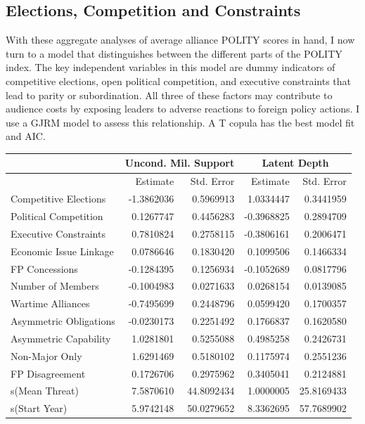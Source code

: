 \documentclass[12pt]{article}
\begin{document}
\subsection{Elections, Competition and Constraints} 


With these aggregate analyses of average alliance POLITY scores in hand, I now turn to a model that distinguishes between the different parts of the POLITY index. 
The key independent variables in this model are dummy indicators of competitive elections, open political competition, and executive constraints that lead to parity or subordination.
All three of these factors may contribute to audience costs by exposing leaders to adverse reactions to foreign policy actions. 
I use a GJRM model to assess this relationship.
A T copula has the best model fit and AIC. 


\begin{table}[ht]
\centering
\begin{tabular}{lrrrr}
 & \multicolumn{2}{c}{Uncond. Mil. Support} & \multicolumn{2}{c}{Latent Depth}\\ \hline
   & Estimate & Std. Error & Estimate & Std. Error \\ 
  \hline 
  Competitive Elections & -1.3862036 & 0.5969913 & 1.0334447 & 0.3441959 \\ 
  Political Competition & 0.1267747 & 0.4456283 & -0.3968825 & 0.2894709 \\ 
  Executive Constraints & 0.7810824 & 0.2758115 & -0.3806161 & 0.2006471 \\ 
  Economic Issue Linkage & 0.0786646 & 0.1830420 & 0.1099506 & 0.1466334 \\ 
  FP Concessions & -0.1284395 & 0.1256934 & -0.1052689 & 0.0817796 \\ 
  Number of Members & -0.1004983 & 0.0271633 & 0.0268154 & 0.0139085 \\ 
  Wartime Alliances & -0.7495699 & 0.2448796 & 0.0599420 & 0.1700357 \\ 
  Asymmetric Obligations & -0.0230173 & 0.2251492 & 0.1766837 & 0.1620580 \\ 
  Asymmetric Capability & 1.0281801 & 0.5255088 & 0.4985258 & 0.2426731 \\ 
  Non-Major Only & 1.6291469 & 0.5180102 & 0.1175974 & 0.2551236 \\ 
  FP Disagreement & 0.1726706 & 0.2975962 & 0.3405041 & 0.2124881 \\ 
  s(Mean Threat) & 7.5870610 & 44.8092434 & 1.0000005 & 25.8169433 \\ 
  s(Start Year) & 5.9742148 & 50.0279652 & 8.3362695 & 57.7689902 \\ 

\end{tabular}
\end{table}
\end{document}
